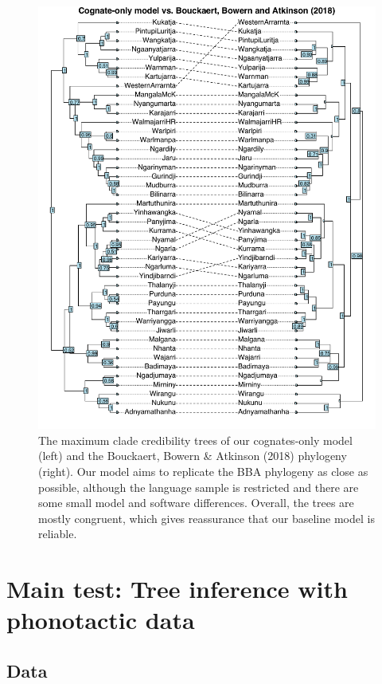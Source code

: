 \documentclass[]{article}
\begin{document}
\begin{figure}
\centering
\includegraphics{fig/cogs_vs_bba2018.pdf}
\caption{\label{fig:cogs-vs-bba2018}The maximum clade credibility trees of our cognates-only model (left) and the Bouckaert, Bowern \& Atkinson (2018) phylogeny (right). Our model aims to replicate the BBA phylogeny as close as possible, although the language sample is restricted and there are some small model and software differences. Overall, the trees are mostly congruent, which gives reassurance that our baseline model is reliable.}
\end{figure}

\hypertarget{main-test}{%
\section{Main test: Tree inference with phonotactic data}\label{main-test}}

\hypertarget{data}{%
\subsection{Data}\label{data}}
\end{document}
